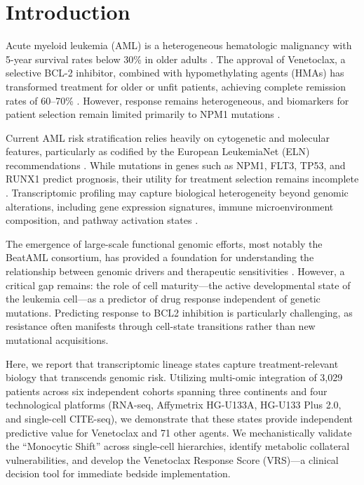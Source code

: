\documentclass[11pt,a4paper]{article}
\begin{document}
\newpage

\section{Introduction}

Acute myeloid leukemia (AML) is a heterogeneous hematologic malignancy with 5-year survival rates below 30\% in older adults \cite{dohner2015aml}. The approval of Venetoclax, a selective BCL-2 inhibitor, combined with hypomethylating agents (HMAs) has transformed treatment for older or unfit patients, achieving complete remission rates of 60--70\% \cite{dinardo2020venetoclax,pollyea2020venetoclax,wei2020venetoclax,dinardo2020nejm}. However, response remains heterogeneous, and biomarkers for patient selection remain limited primarily to NPM1 mutations \cite{morsia2020npm1,stahl2021venetoclax}.

Current AML risk stratification relies heavily on cytogenetic and molecular features, particularly as codified by the European LeukemiaNet (ELN) recommendations \cite{dohner2017eln,dohner2022eln}. While mutations in genes such as NPM1, FLT3, TP53, and RUNX1 predict prognosis, their utility for treatment selection remains incomplete \cite{papaemmanuil2016genomic}. Transcriptomic profiling may capture biological heterogeneity beyond genomic alterations, including gene expression signatures, immune microenvironment composition, and pathway activation states \cite{cancer2013tcga}.

The emergence of large-scale functional genomic efforts, most notably the BeatAML consortium, has provided a foundation for understanding the relationship between genomic drivers and therapeutic sensitivities \cite{tyner2018beataml}. However, a critical gap remains: the role of cell maturity—the active developmental state of the leukemia cell—as a predictor of drug response independent of genetic mutations. Predicting response to BCL2 inhibition is particularly challenging, as resistance often manifests through cell-state transitions rather than new mutational acquisitions.

Here, we report that transcriptomic lineage states capture treatment-relevant biology that transcends genomic risk. Utilizing multi-omic integration of 3,029 patients across six independent cohorts spanning three continents and four technological platforms (RNA-seq, Affymetrix HG-U133A, HG-U133 Plus 2.0, and single-cell CITE-seq), we demonstrate that these states provide independent predictive value for Venetoclax and 71 other agents. We mechanistically validate the ``Monocytic Shift'' across single-cell hierarchies, identify metabolic collateral vulnerabilities, and develop the Venetoclax Response Score (VRS)---a clinical decision tool for immediate bedside implementation.
\end{document}
